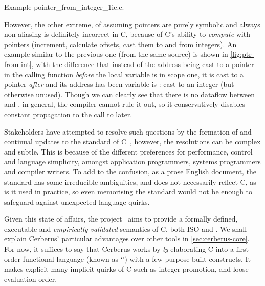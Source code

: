\begin{marginfigure}
    \centering
    \caption{Example pointer\_from\_integer\_1ie.c.}\label{fig:ptr-from-int}
\end{marginfigure}%

However, the other extreme, of assuming pointers are purely symbolic and always
non-aliasing is definitely incorrect in C, because of C's ability to
\emph{compute} with pointers (increment, calculate offsets, cast them to and
from integers). An example similar to the previous one (from the same source)
is shown in \cref{fig:ptr-from-int}, with the difference that instead of the
address being cast to a pointer in the calling function \emph{before} the local
variable is in scope one, it is cast to a pointer \emph{after} and its address
has been variable is : cast to an integer (but otherwise
unused). Though we can clearly see that there is no dataflow between
 and , in general, the compiler cannot rule it out, so it
conservatively disables constant propagation to the call to 
later.

Stakeholders have attempted to resolve such questions by the formation of and
continual updates to the  standard of C~\cite{isoC1990}, however, the
resolutions can be complex and subtle. This is because of the different
preferences for performance, control and language simplicity, amongst
application programmers, systems programmers and compiler writers. To add to
the confusion, as a prose English document, the standard has some irreducible
ambiguities, and does not necessarily reflect  C, as is it
used in practice, so even memorising the standard would not be enough to
safeguard against unexpected language quirks.

Given this state of affairs, the 
project~ aims to provide a formally defined,
executable and \emph{empirically validated} semantics of C, both ISO and . We shall explain Cerberus' particular advantages over other tools in
\cref{sec:cerberus-core}. For now, it suffices to say that Cerberus works by
\emph{ly} elaborating C into a first-order functional
language (known as `') with a few purpose-built constructs. It
makes explicit many implicit quirks of C such as integer promotion,  and
loose evaluation order.

